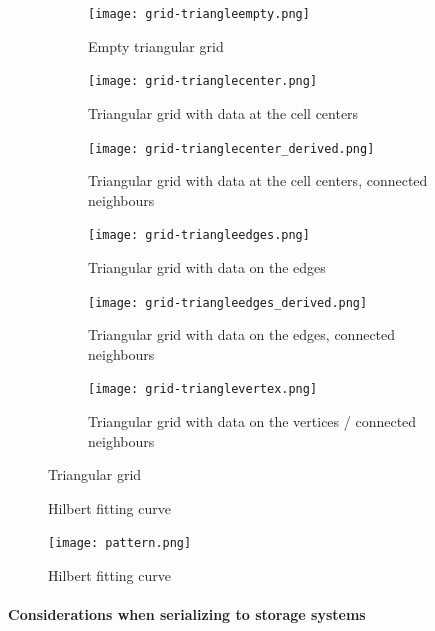 \documentclass{../../template/esiwace-report}
\begin{document}
\begin{figure}[!tbp]
 \centering
  \begin{subfigure}[b]{0.4\textwidth}
	 \texttt{[image: grid-triangleempty.png]}
	 \caption{Empty triangular grid}
	 \label{fig:grid-triangleempty}
 \end{subfigure}
 \hfill
 \begin{subfigure}[b]{0.4\textwidth}
	 \texttt{[image: grid-trianglecenter.png]}
	 \caption{Triangular grid with data at the cell centers}
	 \label{fig:grid-trianglecenter}
 \end{subfigure}
 \hfill
 \begin{subfigure}[b]{0.4\textwidth}
	 \texttt{[image: grid-trianglecenter\_derived.png]}
	 \caption{Triangular grid with data at the cell centers, connected neighbours}
	 \label{fig:grid-trianglecenter_derived}
 \end{subfigure}
 \hfill
 \begin{subfigure}[b]{0.4\textwidth}
	 \texttt{[image: grid-triangleedges.png]}
	 \caption{Triangular grid with data on the edges}
	 \label{fig:grid-triangleedges}
 \end{subfigure}
 \hfill
 \begin{subfigure}[b]{0.4\textwidth}
	 \texttt{[image: grid-triangleedges\_derived.png]}
	 \caption{Triangular grid with data on the edges, connected neighbours}
	 \label{fig:grid-triangleedges_derived}
 \end{subfigure}
 \hfill
 \begin{subfigure}[b]{0.4\textwidth}
	 \texttt{[image: grid-trianglevertex.png]}
	 \caption{Triangular grid with data on the vertices / connected neighbours}
	 \label{fig:grid-trianglevertex}
 \end{subfigure}
 \caption{Triangular grid}
 \label{fig:triangulargrid}
\end{figure}

\begin{figure}[!tbp]
 \centering
 \caption{Hilbert fitting curve}
 \label{fig:hilbert-test}
\end{figure}

\begin{figure}[!tbp]
 \centering
 \texttt{[image: pattern.png]}
 \caption{Hilbert fitting curve}
 \label{fig:hilbert-test}
\end{figure}

\paragraph{Considerations when serializing to storage systems}
\end{document}
